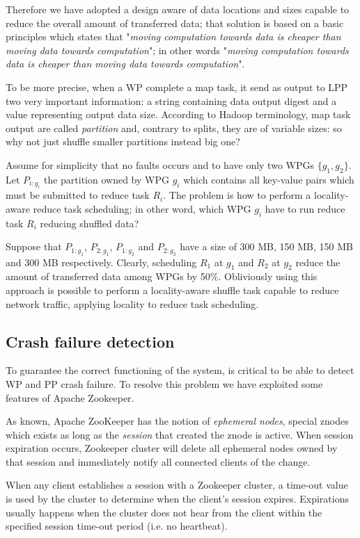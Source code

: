 \documentclass[sigchi]{acmart}
\begin{document}
Therefore we have adopted a design aware of data locations and sizes capable to reduce the overall amount of transferred data; that solution is based on a basic principles which states that "\textit{moving computation towards data is cheaper than moving data towards computation}"; in other words  "\textit{moving computation towards data is cheaper than moving data towards computation}".

To be more precise, when a WP complete a map task, it send as output to LPP two very important information: a string containing data output digest and a value representing output data size. According to Hadoop terminology, map task output are called \textit{partition} and, contrary to splits, they are of variable sizes: so why not just shuffle smaller partitions instead big one? 

Assume for simplicity that no faults occurs and to have only two WPGs $\lbrace g_1, g_2 \rbrace$. Let $P_{i:g_i}$ the partition owned by WPG $g_i$ which contains all key-value pairs which must be submitted to reduce task $R_i$. The problem is how to perform a locality-aware reduce task scheduling; in other word, which WPG $g_i$ have to run reduce task $R_i$ reducing shuffled data?

Suppose that $P_{1:g_1}$, $P_{2:g_1}$, $P_{1:g_2}$ and $P_{2:g_2}$ have a size of 300 MB, 150 MB, 150 MB and 300 MB respectively. Clearly, scheduling $R_1$ at $g_1$ and $R_2$ at $g_2$ reduce the amount of transferred data among WPGs by 50\%. Obliviously using this approach is possible to perform a locality-aware shuffle task capable to reduce network traffic, applying locality to reduce task scheduling.  

\subsection{Crash failure detection} To guarantee the correct functioning of the system, is critical to be able to detect WP and PP crash failure. To resolve this problem we have exploited some features of Apache Zookeeper. 

As known, Apache ZooKeeper has the notion of \textit{ephemeral nodes}, special znodes which exists as long as the \textit{session} that created the znode is active. When session expiration occurs, Zookeeper cluster will delete all ephemeral nodes owned by that session and immediately notify all connected clients of the change.

When any client establishes a session with a Zookeeper cluster, a time-out value is used by the cluster to determine when the client's session expires. Expirations usually happens when the cluster does not hear from the client within the specified session time-out period (i.e. no heartbeat).
\end{document}
